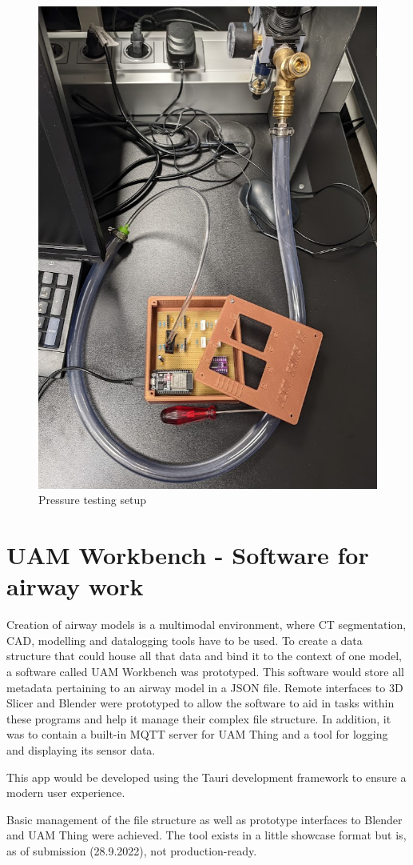 \documentclass[MME,Projekt,english]{twbook}%
\begin{document}
\begin{figure}[!htbp]
	\centering
	\includegraphics[width=.6\linewidth]{images/pressure-test.png}
	\caption{Pressure testing setup}\label{pressure-test}
\end{figure}

\newpage

\section{UAM Workbench - Software for airway work}

Creation of airway models is a multimodal environment, where CT segmentation, CAD, modelling and datalogging tools have to be used.
To create a data structure that could house all that data and bind it to the context of one model, a software called UAM Workbench
was prototyped. This software would store all metadata pertaining to an airway model in a JSON file. Remote interfaces to 3D Slicer
and Blender were prototyped to allow the software to aid in tasks within these programs and help it manage their complex file structure.
In addition, it was to contain a built-in MQTT server for UAM Thing and a tool for logging and displaying its sensor data.

This app would be developed using the Tauri development framework to ensure a modern user experience.

Basic management of the file structure as well as prototype interfaces to Blender and UAM Thing were achieved. The tool exists in
a little showcase format but is, as of submission (28.9.2022), not production-ready.
\end{document}
